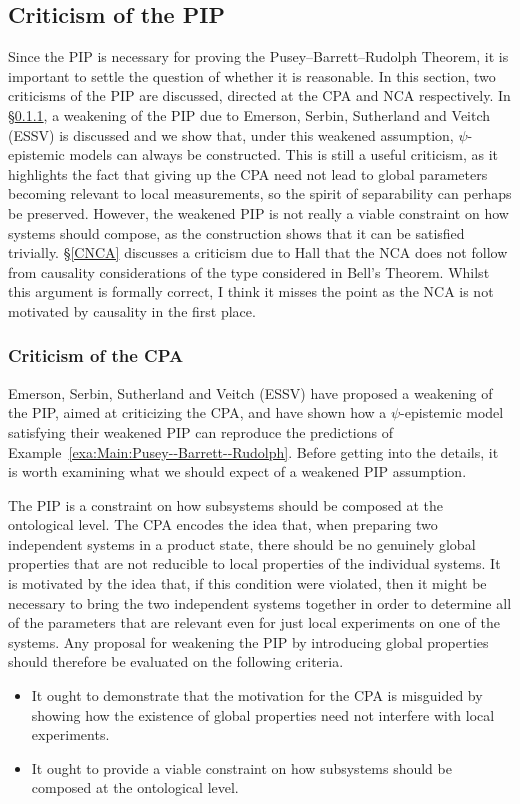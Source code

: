 \documentclass[DIV=calc,paper=a4,fontsize=11pt,twocolumn]{scrartcl} %
\theoremstyle{definition}
\theoremstyle{plain}
\begin{document}
\subsection{Criticism of the PIP}

\label{CPIP}

Since the PIP is necessary for proving the Pusey--Barrett--Rudolph Theorem, it is
important to settle the question of whether it is reasonable.  In this
section, two criticisms of the PIP are discussed, directed at the CPA
and NCA respectively.  In \S\ref{CCPA}, a weakening of the PIP due to
Emerson, Serbin, Sutherland and Veitch (ESSV) \cite{Emerson2013} is
discussed and we show that, under this weakened assumption,
$\psi$-epistemic models can always be constructed.  This is still a
useful criticism, as it highlights the fact that giving up the CPA
need not lead to global parameters becoming relevant to local
measurements, so the spirit of separability can perhaps be preserved.
However, the weakened PIP is not really a viable constraint on how
systems should compose, as the construction shows that it can be
satisfied trivially.  \S\ref{CNCA} discusses a criticism due to Hall
\cite{Hall2011} that the NCA does not follow from causality
considerations of the type considered in Bell's Theorem.  Whilst this
argument is formally correct, I think it misses the point as the NCA
is not motivated by causality in the first place.

\subsubsection{Criticism of the CPA}

\label{CCPA}

Emerson, Serbin, Sutherland and Veitch (ESSV) \cite{Emerson2013} have
proposed a weakening of the PIP, aimed at criticizing the CPA, and
have shown how a $\psi$-epistemic model satisfying their weakened PIP
can reproduce the predictions of Example~\ref{exa:Main:Pusey--Barrett--Rudolph}.  Before
getting into the details, it is worth examining what we should expect
of a weakened PIP assumption.

The PIP is a constraint on how subsystems should be composed at the
ontological level.  The CPA encodes the idea that, when preparing two
independent systems in a product state, there should be no genuinely
global properties that are not reducible to local properties of the
individual systems.  It is motivated by the idea that, if this
condition were violated, then it might be necessary to bring the two
independent systems together in order to determine all of the
parameters that are relevant even for just local experiments on one of
the systems.  Any proposal for weakening the PIP by introducing global
properties should therefore be evaluated on the following criteria.
\begin{itemize}
\item It ought to demonstrate that the motivation for the CPA is
misguided by showing how the existence of global properties need not
interfere with local experiments.
\item It ought to provide a viable constraint on how subsystems should
be composed at the ontological level.
\end{itemize}
\end{document}
